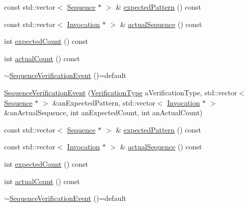 \begin{DoxyCompactItemize}
\item 
const std\+::vector$<$ \mbox{\hyperlink{classfakeit_1_1Sequence}{Sequence}} $\ast$ $>$ \& \mbox{\hyperlink{structfakeit_1_1SequenceVerificationEvent_a2d3fb35082acdadfe2be2a4d69c94189}{expected\+Pattern}} () const
\item 
const std\+::vector$<$ \mbox{\hyperlink{structfakeit_1_1Invocation}{Invocation}} $\ast$ $>$ \& \mbox{\hyperlink{structfakeit_1_1SequenceVerificationEvent_aecdc4dac839dc16a96ee85b0d0297bed}{actual\+Sequence}} () const
\item 
int \mbox{\hyperlink{structfakeit_1_1SequenceVerificationEvent_ad0970b6b1b3b3d122e0494e95c6a00eb}{expected\+Count}} () const
\item 
int \mbox{\hyperlink{structfakeit_1_1SequenceVerificationEvent_a4f7daa947cca317c30e74ee66540d3b9}{actual\+Count}} () const
\item 
\mbox{\hyperlink{structfakeit_1_1SequenceVerificationEvent_a8f8e45c2407802e200befa82790c5e13}{$\sim$\+Sequence\+Verification\+Event}} ()=default
\item 
\mbox{\hyperlink{structfakeit_1_1SequenceVerificationEvent_ab0842bb20a84757c265ecdee00f41c91}{Sequence\+Verification\+Event}} (\mbox{\hyperlink{namespacefakeit_a9df22520dd60badb149c1d1d2518b253}{Verification\+Type}} a\+Verification\+Type, std\+::vector$<$ \mbox{\hyperlink{classfakeit_1_1Sequence}{Sequence}} $\ast$ $>$ \&an\+Expected\+Pattern, std\+::vector$<$ \mbox{\hyperlink{structfakeit_1_1Invocation}{Invocation}} $\ast$ $>$ \&an\+Actual\+Sequence, int an\+Expected\+Count, int an\+Actual\+Count)
\item 
const std\+::vector$<$ \mbox{\hyperlink{classfakeit_1_1Sequence}{Sequence}} $\ast$ $>$ \& \mbox{\hyperlink{structfakeit_1_1SequenceVerificationEvent_a2d3fb35082acdadfe2be2a4d69c94189}{expected\+Pattern}} () const
\item 
const std\+::vector$<$ \mbox{\hyperlink{structfakeit_1_1Invocation}{Invocation}} $\ast$ $>$ \& \mbox{\hyperlink{structfakeit_1_1SequenceVerificationEvent_aecdc4dac839dc16a96ee85b0d0297bed}{actual\+Sequence}} () const
\item 
int \mbox{\hyperlink{structfakeit_1_1SequenceVerificationEvent_ad0970b6b1b3b3d122e0494e95c6a00eb}{expected\+Count}} () const
\item 
int \mbox{\hyperlink{structfakeit_1_1SequenceVerificationEvent_a4f7daa947cca317c30e74ee66540d3b9}{actual\+Count}} () const
\item 
\mbox{\hyperlink{structfakeit_1_1SequenceVerificationEvent_a8f8e45c2407802e200befa82790c5e13}{$\sim$\+Sequence\+Verification\+Event}} ()=default

\end{DoxyCompactItemize}
